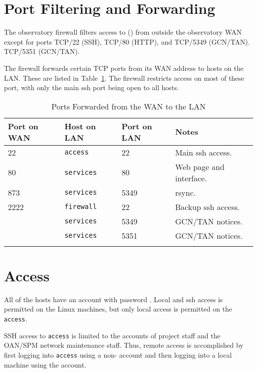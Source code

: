 \section{Port Filtering and Forwarding}

The observatory firewall filters access to {\ttfamily \projectexternalipname} ({\projectexternalipaddress}) from outside the observatory WAN except for ports TCP/22 (SSH), TCP/80 (HTTP), and \ifcoatli
TCP/5349 (GCN/TAN).
\fi
\ifddoti
TCP/5351 (GCN/TAN).
\fi

The firewall forwards certain TCP ports from its WAN address to hosts on the LAN. These are listed in Table~\ref{table:port-forwarding}. The firewall restricts access on most of these port, with only the main ssh port being open to all hosts.

\begin{table}
\caption{Ports Forwarded from the WAN to the LAN}
\label{table:port-forwarding}
\begin{center}
\begin{tabular}{llll}
\hline
Port on WAN&Host on LAN&Port on LAN&Notes\\
\hline
22&\verb|access|&22&Main ssh access.\\
80&\verb|services|&80&Web page and interface.\\
873&\verb|services|&5349&rsync.\\
2222&\verb|firewall|&22&Backup ssh access.\\
\ifcoatli
5349&\verb|services|&5349&GCN/TAN notices.\\
\fi
\ifddoti
5351&\verb|services|&5351&GCN/TAN notices.\\
\fi
\hline
\end{tabular}
\end{center}
\end{table}

\section{Access}

All of the hosts have an account {\projectaccount} with password {\projectaccount}. Local and ssh access is permitted on the Linux machines, but only local access is permitted on the \verb|access|.

SSH access to \verb|access| is limited to the accounts of project staff and the OAN/SPM network maintenance staff. Thus, remote access is accomplished by first logging into \verb|access| using a non-{\projectaccount} account and then logging into a local machine using the {\projectaccount} account.

